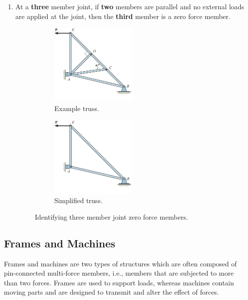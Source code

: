 \documentclass{article}
\begin{document}
\begin{enumerate}
\begin{figure}[H]
          \end{figure}
    \item At a \textbf{three} member joint, if \textbf{two} members are parallel and no external loads are
          applied at the joint, then the \textbf{third} member is a zero force member.
          \begin{figure}[H]
              \centering
              \begin{subfigure}{0.48\linewidth}
                  \centering
                  \includegraphics[height = 4cm, keepaspectratio = true]{figures/zero_force_three_member.pdf}
                  \caption{Example truss.}
              \end{subfigure}
              \begin{subfigure}{0.48\linewidth}
                  \centering
                  \includegraphics[height = 4cm, keepaspectratio = true]{figures/zero_force_three_member_simplified.pdf}
                  \caption{Simplified truss.}
              \end{subfigure}
              \caption{Identifying three member joint zero force members.} %
          \end{figure}
\end{enumerate}
\subsection{Frames and Machines}
Frames and machines are two types of structures which are often
composed of pin-connected multi-force members, i.e., members that are
subjected to more than two forces. Frames are used to support loads,
whereas machines contain moving parts and are designed to transmit and
alter the effect of forces.
\end{document}
